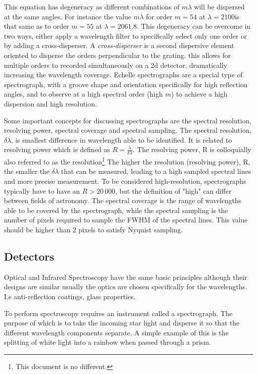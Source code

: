 This equation has degeneracy as different combinations of $m \lambda$ will be dispersed at the same angles. For instance the value $m \lambda$ for order $m=54$ at $\lambda=2100$\nm is that same as to order $m=55$ at $\lambda=2061.8$\nm. This degeneracy can be overcome in two ways, either apply a wavelength filter to specifically select only one order or by adding a cross-disperser. A \emph{cross-disperser} is a second dispersive element oriented to disperse the orders perpendicular to the grating. this allows for multiple orders to recorded simultaneously on a 2d detector, dramatically increasing the wavelength coverage.
Echelle spectrographs are a special type of spectrograph, with a groove shape and orientation specifically for high reflection angles, and to observe at a high spectral order (high $m$) to achieve a high dispersion and high resolution.

Some important concepts for discussing spectrographs are the spectral resolution, resolving power, spectral coverage and spectral sampling.
The spectral resolution, \(\delta \lambda\), is smallest difference in wavelength able to be identified. It is related to resolving power which is defined as \(R=\frac{\lambda}{\delta\lambda}\). The resolving power, R is colloquially also referred to as the resolution\footnote{This document is no different.} The higher the resolution (resolving power), R, the smaller the \(\delta\lambda\) that can be measured, leading to a high sampled spectral lines and more precise measurement. To be considered high-resolution, spectrographs typically have to have an \(R>20\,000\), but the definition of "high" can differ between fields of astronomy.  
The spectral coverage is the range of wavelengths able to be covered by the spectrograph, while the spectral sampling is the number of pixels required to sample the FWHM of the spectral lines. This value should be higher than 2 pixels to satisfy Nyquist sampling.

\subsection{Detectors}

Optical and Infrared Spectroscopy have the same basic principles although their designs are similar usually the optics are chosen specifically for the wavelengths. I.e anti-reflection coatings, glass properties.  


To perform spectroscopy requires an instrument called a spectrograph. The purpose of which is to take the incoming star light and disperse it so that the different wavelength components separate. A simple example of this is the splitting of white light into a rainbow when passed through a prism.

